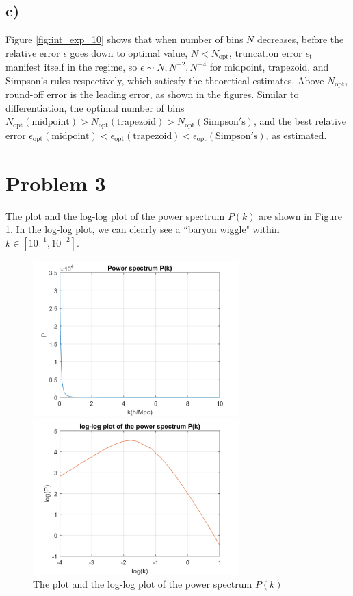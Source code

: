 \documentclass[12pt, graphicx]{article}
\begin{document}
\subsection*{c)}
Figure \ref{fig:int_exp_10} shows that when number of bins $N$ decreases, before the relative error $\epsilon$ goes down to optimal value, $N<N_\mathrm{opt}$, truncation error $\epsilon_\mathrm{t}$ manifest itself in the regime, so $\epsilon\sim N, N^{-2}, N^{-4}$ for midpoint, trapezoid, and Simpson's rules respectively, which satiesfy the theoretical estimates. Above $N_\mathrm{opt}$, round-off error is the leading error, as shown in the figures. Similar to differentiation, the optimal number of bins $N_\mathrm{opt}\mathrm{(midpoint)}>N_\mathrm{opt}\mathrm{(trapezoid)}>N_\mathrm{opt}\mathrm{(Simpson's)}$, and the best relative error $\epsilon_\mathrm{opt}\mathrm{(midpoint)}<\epsilon_\mathrm{opt}\mathrm{(trapezoid)}<\epsilon_\mathrm{opt}\mathrm{(Simpson's)}$, as estimated.


\section*{Problem 3}
The plot and the log-log plot of the power spectrum $P(k)$ are shown in Figure \ref{fig:Pk}. In the log-log plot, we can clearly see a \textquotedblleft baryon wiggle" within $k\in[10^{-1}, 10^{-2}]$.

\begin{figure}[ht]
\begin{minipage}{0.48\linewidth}
\centering
\includegraphics[width = 80mm]{Pk.png}
\end{minipage}
\begin{minipage}{0.48\linewidth}
\centering
\includegraphics[width = 80mm]{logPk.png}
\end{minipage}
\caption{The plot and the log-log plot of the power spectrum $P(k)$}
\label{fig:Pk}
\end{figure}
\end{document}

